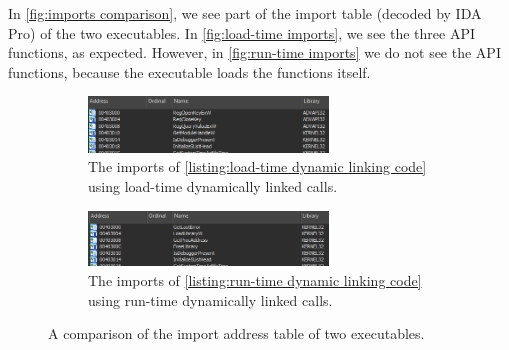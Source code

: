 In \autoref{fig:imports comparison}, we see part of the import table (decoded by IDA Pro) of the two executables. In \autoref{fig:load-time imports}, we see the three API functions, as expected. However, in \autoref{fig:run-time imports} we do not see the API functions, because the executable loads the functions itself.

\begin{figure}[ht]
    \centering
    \begin{subfigure}[ht]{\textwidth}
        \centering
        \includegraphics[width=0.7\textwidth]{resources/images/load_time_api_call_imports.png}
        \caption{The imports of \autoref{listing:load-time dynamic linking code} using load-time dynamically linked calls.}
        \label{fig:load-time imports}
    \end{subfigure}
    \hfill
    \begin{subfigure}[ht]{\textwidth}
        \centering
        \includegraphics[width=0.7\textwidth]{resources/images/run_time_api_call_imports.png}
        \caption{The imports of \autoref{listing:run-time dynamic linking code} using run-time dynamically linked calls.}
        \label{fig:run-time imports}
    \end{subfigure}
    \caption{A comparison of the import address table of two executables.}
    \label{fig:imports comparison}
\end{figure}

